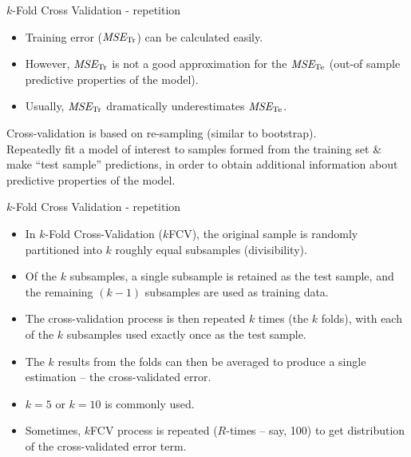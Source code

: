 \documentclass{beamer}
\begin{document}
\begin{frame}{$k$-Fold Cross Validation - repetition}
\begin{itemize}
\item Training error ($\textit{MSE}_{\textnormal{Tr}}$) can be calculated easily. 
\item However, $\textit{MSE}_{\textnormal{Tr}}$ is not a good approximation for the $\textit{MSE}_{\textnormal{Te}}$ (out-of sample predictive properties of the model).
\item Usually, $\textit{MSE}_{\textnormal{Tr}}$ dramatically underestimates $\textit{MSE}_{\textnormal{Te}}$.
\end{itemize}
\bigskip
Cross-validation is based on re-sampling (similar to bootstrap).\\
\medskip
Repeatedly fit a model of interest to samples formed from the training set \& make ``test sample'' predictions, in order to obtain additional information about predictive properties of the model.\\
\end{frame}
\begin{frame}{$k$-Fold Cross Validation - repetition}
\begin{itemize}
  \item In $k$-Fold Cross-Validation ($k$FCV), the original sample is randomly partitioned into $k$ roughly equal subsamples (divisibility). 
  \item Of the $k$ subsamples, a single subsample is retained as the test sample, and the remaining $(k-1)$ subsamples are used as training data. 
  \item The cross-validation process is then repeated $k$ times (the $k$ folds), with each of the $k$ subsamples used exactly once as the test sample. 
  \item The $k$ results from the folds can then be averaged to produce a single estimation -- the cross-validated error. 
  \item $k = 5$ or $k=10$ is commonly used.
  \item Sometimes, $k$FCV process is repeated ($R$-times -- say, 100) to get distribution of the cross-validated error term.
\end{itemize}  
\end{frame}
\end{document}

